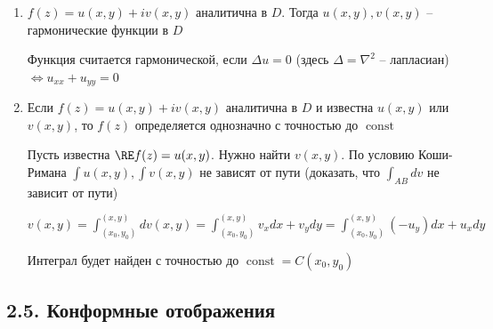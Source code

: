 \begin{enumerate}[label=\arabic*$^\circ$]
\begin{MyProof}
        Найдем $f^\prime_z(z_0) = \frac{1}{g^\prime_w(w_0)}$. 
        Рассмотрим отношение $\frac{\Delta z}{\Delta w} \underset{\Delta z \to 0}{\overset{\Delta w \to 0}{\longrightarrow}} 
        \lim_{\substack{\Delta w \to 0 \\ \Delta z \to 0}} \frac{\Delta z}{\Delta w} = \lim_{\substack{\Delta w \to 0 \\ \Delta z \to 0}} \frac{1}{\frac{\Delta w}{\Delta z}} = 
        \frac{1}{\lim_{\Delta z \to 0} \frac{\Delta w}{\Delta z}} = \frac{1}{f^\prime_z (z_0)} \Longrightarrow \lim_{\Delta w \to 0} \frac{\Delta z}{\Delta w} = g^\prime_w(w_0) = \frac{1}{f^\prime_z(z_0)}$ или $f^\prime_z(z_0) = \frac{1}{g^\prime_w(w_0)}$
    \end{MyProof}

    \item $f(z) = u(x, y) + i v(x, y)$ аналитична в $D$. Тогда $u(x, y), v(x, y)$ -- гармонические функции в $D$

    \begin{MyProof}
        Функция считается гармонической, если $\Delta u = 0$ (здесь $\Delta = \nabla^2$ -- лапласиан) $\Longleftrightarrow u_{xx} + u_{yy} = 0$
        
        \Lab
    \end{MyProof}

    \item Если $f(z) = u(x, y) + i v(x, y)$ аналитична в $D$ и известна $u(x, y)$ или $v(x, y)$, то $f(z)$ определяется однозначно с точностью до $\operatorname{const}$

    \begin{MyProof}
        Пусть известна $\RE f(z) = u(x, y)$. Нужно найти $v(x, y)$. По условию Коши-Римана $\int u(x, y), \int v(x, y)$ не зависят от пути
        (\Lab доказать, что $\int_{AB} dv$ не зависит от пути)

        $v(x, y) = \int_{(x_0, y_0)}^{(x, y)} dv(x, y) = \int_{(x_0, y_0)}^{(x, y)} v_x dx + v_y dy = \int_{(x_0, y_0)}^{(x, y)} (-u_y) dx + u_x dy$

        Интеграл будет найден с точностью до $\operatorname{const} = C(x_0, y_0)$
    \end{MyProof}

\end{enumerate}


\subsection{2.5. Конформные отображения}

